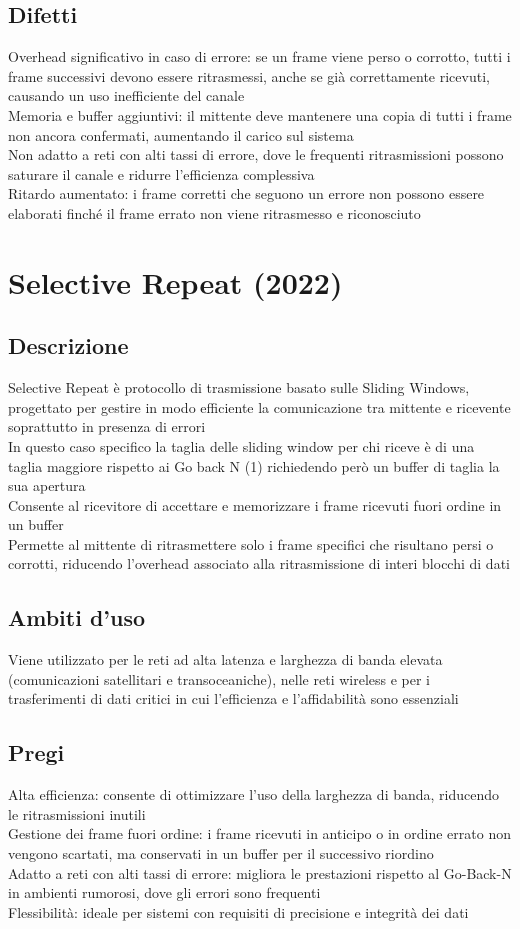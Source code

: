 \documentclass[10pt,oneside,a4paper]{article}
\begin{document}
\subsection{Difetti}
Overhead significativo in caso di errore: se un frame viene perso o corrotto, tutti i frame successivi devono essere ritrasmessi, anche se già correttamente ricevuti, causando un uso inefficiente del canale\\
Memoria e buffer aggiuntivi: il mittente deve mantenere una copia di tutti i frame non ancora confermati, aumentando il carico sul sistema\\
Non adatto a reti con alti tassi di errore, dove le frequenti ritrasmissioni possono saturare il canale e ridurre l'efficienza complessiva\\
Ritardo aumentato: i frame corretti che seguono un errore non possono essere elaborati finché il frame errato non viene ritrasmesso e riconosciuto
\section{Selective Repeat (2022)}
\subsection{Descrizione}
Selective Repeat è protocollo di trasmissione basato sulle Sliding Windows, progettato per gestire in modo efficiente la comunicazione tra mittente e ricevente soprattutto in presenza di errori\\
In questo caso specifico la taglia delle sliding window per chi riceve è di una taglia maggiore rispetto ai Go back N (1) richiedendo però un buffer di taglia la sua apertura\\
Consente al ricevitore di accettare e memorizzare i frame ricevuti fuori ordine in un buffer\\
Permette al mittente di ritrasmettere solo i frame specifici che risultano persi o corrotti, riducendo l'overhead associato alla ritrasmissione di interi blocchi di dati
\subsection{Ambiti d'uso}
Viene utilizzato per le reti ad alta latenza e larghezza di banda elevata (comunicazioni satellitari e transoceaniche), nelle reti wireless e per i trasferimenti di dati critici in cui l'efficienza e l'affidabilità sono essenziali
\subsection{Pregi}
Alta efficienza: consente di ottimizzare l'uso della larghezza di banda, riducendo le ritrasmissioni inutili\\
Gestione dei frame fuori ordine: i frame ricevuti in anticipo o in ordine errato non vengono scartati, ma conservati in un buffer per il successivo riordino\\
Adatto a reti con alti tassi di errore: migliora le prestazioni rispetto al Go-Back-N in ambienti rumorosi, dove gli errori sono frequenti\\
Flessibilità: ideale per sistemi con requisiti di precisione e integrità dei dati
\end{document}
